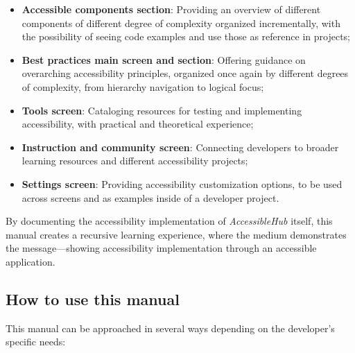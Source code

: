 \begin{itemize}
    \item \textbf{Accessible components section}: Providing an overview of different components of different degree of complexity organized incrementally, with the possibility of seeing code examples and use those as reference in projects;
    
    \item \textbf{Best practices main screen and section}: Offering guidance on overarching accessibility principles, organized once again by different degrees of complexity, from hierarchy navigation to logical focus;
    
    \item \textbf{Tools screen}: Cataloging resources for testing and implementing accessibility, with practical and theoretical experience;
    
    \item \textbf{Instruction and community screen}: Connecting developers to broader learning resources and different accessibility projects;
    
    \item \textbf{Settings screen}: Providing accessibility customization options, to be used across screens and as examples inside of a developer project.
\end{itemize}

By documenting the accessibility implementation of \textit{AccessibleHub} itself, this manual creates a recursive learning experience, where the medium demonstrates the message—showing accessibility implementation through an accessible application.

\subsection{How to use this manual}
\label{subsec:dev-usage}

This manual can be approached in several ways depending on the developer's specific needs:

